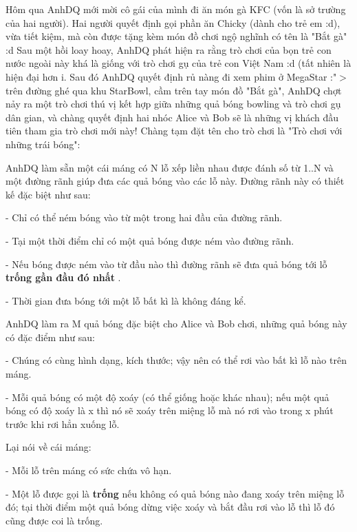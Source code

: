 







   Hôm qua AnhDQ mới mời cô gái của mình đi ăn món gà KFC (vốn là sở trường của hai người). Hai người quyết định gọi phần ăn Chicky (dành cho trẻ em :d), vừa tiết kiệm, mà còn được tặng kèm món đồ chơi ngộ nghĩnh có tên là "Bắt gà" :d Sau một hồi loay hoay, AnhDQ phát hiện ra rằng trò chơi của bọn trẻ con nước ngoài này khá là giống với trò chơi gụ của trẻ con Việt Nam :d (tất nhiên là hiện đại hơn ^^). Sau đó AnhDQ quyết định rủ nàng đi xem phim ở MegaStar :"$>$ trên đường ghé qua khu StarBowl, cầm trên tay món đồ "Bắt gà", AnhDQ chợt nảy ra một trò chơi thú vị kết hợp giữa những quả bóng bowling và trò chơi gụ dân gian, và chàng quyết định hai nhóc Alice và Bob sẽ là những vị khách đầu tiên tham gia trò chơi mới này! Chàng tạm đặt tên cho trò chơi là "Trò chơi với những trái bóng":  

   AnhDQ làm sẵn một cái máng có N lỗ xếp liền nhau được đánh số từ 1..N và một đường rãnh giúp đưa các quả bóng vào các lỗ này. Đường rãnh này có thiết kế đặc biệt như sau:   


   - Chỉ có thể ném bóng vào từ một trong hai đầu của đường rãnh.   


   - Tại một thời điểm chỉ có một quả bóng được ném vào đường rãnh.   


   - Nếu bóng được ném vào từ đầu nào thì đường rãnh sẽ đưa quả bóng tới lỗ   \textbf{    trống gần đầu đó nhất   }   .   


   - Thời gian đưa bóng tới một lỗ bất kì là không đáng kể.  

   AnhDQ làm ra M quả bóng đặc biệt cho Alice và Bob chơi, những quả bóng này có đặc điểm như sau:   


   - Chúng có cùng hình dạng, kích thước; vậy nên có thể rơi vào bất kì lỗ nào trên máng.   


   - Mỗi quả bóng có một độ xoáy (có thể giống hoặc khác nhau); nếu một quả bóng có độ xoáy là x thì nó sẽ xoáy trên miệng lỗ mà nó rơi vào trong x phút trước khi rơi hẳn xuống lỗ.  

   Lại nói về cái máng:   


   - Mỗi lỗ trên máng có sức chứa vô hạn.   


   - Một lỗ được gọi là   \textbf{    trống   }   nếu không có quả bóng nào đang xoáy trên miệng lỗ đó; tại thời điểm một quả bóng dừng việc xoáy và bắt đầu rơi vào lỗ thì lỗ đó cũng được coi là trống.  

